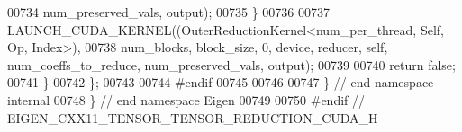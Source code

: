 \begin{DoxyCode}
00734                          num\_preserved\_vals, output);
00735     \}
00736 
00737     LAUNCH\_CUDA\_KERNEL((OuterReductionKernel<num\_per\_thread, Self, Op, Index>),
00738                        num\_blocks, block\_size, 0, device, reducer, \textcolor{keyword}{self}, num\_coeffs\_to\_reduce, 
      num\_preserved\_vals, output);
00739 
00740     \textcolor{keywordflow}{return} \textcolor{keyword}{false};
00741   \}
00742 \};
00743 
00744 \textcolor{preprocessor}{#endif}
00745 
00746 
00747 \} \textcolor{comment}{// end namespace internal}
00748 \} \textcolor{comment}{// end namespace Eigen}
00749 
00750 \textcolor{preprocessor}{#endif // EIGEN\_CXX11\_TENSOR\_TENSOR\_REDUCTION\_CUDA\_H}
\end{DoxyCode}
